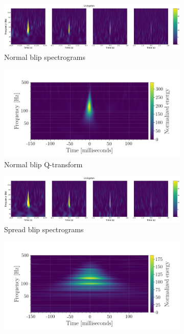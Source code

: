 \documentclass[a4paper]{article}
\begin{document}
\begin{figure}[h!]
	\centering
	\begin{subfigure}[t]{.7\textwidth}
		\centering
		\includegraphics[width=.9\linewidth]{normal_blip_spect}
		\caption{Normal blip spectrograms}
		\label{fig:normal_s}
	\end{subfigure}
	\begin{subfigure}[t]{.29\textwidth}
		\centering
		\includegraphics[width=1.1\linewidth]{normal_blip}
		\caption{Normal blip Q-transform}
		\label{fig:normal_q}
	\end{subfigure}
	\begin{subfigure}[t]{.7\textwidth}
		\centering
		\includegraphics[width=.9\linewidth]{spread_blip_spect}
		\caption{Spread blip spectrograms}
		\label{fig:spread_s}
	\end{subfigure}
	\begin{subfigure}[t]{.29\textwidth}
		\centering
		\includegraphics[width=1.1\linewidth]{spread_blip}

\end{subfigure}
\end{figure}
\end{document}
